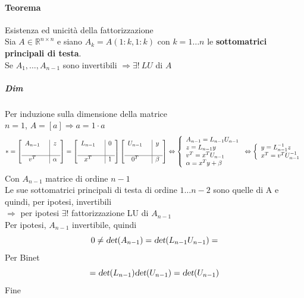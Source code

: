 \documentclass[10pt]{book}
\begin{document}
\paragraph{Teorema} Esistenza ed unicità della fattorizzazione\\
Sia $A \in \mathbb{R}^{n \times n}$ e siano $A_k = A(1:k, 1:k)$ con $k = 1\ldots n$ le \textbf{sottomatrici principali di testa}.\\
Se $A_1, \ldots, A_{n-1}$ sono invertibili $\Rightarrow\exists !\: LU$ di $A$
\subparagraph{Dim} Per induzione sulla dimensione della matrice\\
$n = 1$, $A = [a] \Rightarrow a = 1\cdot a$
$$* = \left[ 
\begin{array}{c c | c}
	A_{n-1} & & z\\
	& &\\
	\hline
	v^T & & \alpha
\end{array}
\right]
= \left[ 
\begin{array}{c c | c}
	L_{n-1} & & 0\\
	& &\\
	\hline
	x^T & & 1
\end{array}
\right]
\left[ 
\begin{array}{c c | c}
	U_{n-1} & & y\\
	& &\\
	\hline
	0^T & & \beta
\end{array}
\right]
\Leftrightarrow
\left\{
\begin{array}{l}
A_{n-1} = L_{n-1}U_{n-1}\\
z = L_{n-1}y\\
v^T = x^T U_{n-1}\\
\alpha = x^T y + \beta
\end{array}
\right.
\Leftrightarrow
\left\{
\begin{array}{l}
y = L_{n-1}^{-1}z\\
x^T = v^T U_{n-1}^{-1}\\
\end{array}
\right.
$$
Con $A_{n-1}$ matrice di ordine $n - 1$\\
Le sue sottomatrici principali di testa di ordine $1\ldots n-2$ sono quelle di A e quindi, per ipotesi, invertibili\\
$\Rightarrow$ per ipotesi $\exists !$ fattorizzazione LU di $A_{n-1}$\\
Per ipotesi, $A_{n-1}$ invertibile, quindi
$$0 \neq \textsl{det}(A_{n-1}) = \textsl{det}(L_{n-1}U_{n-1}) =$$
Per Binet
$$ = \textsl{det}(L_{n-1})\textsl{det}(U_{n-1}) = \textsl{det}(U_{n-1})$$
Fine
\end{document}
